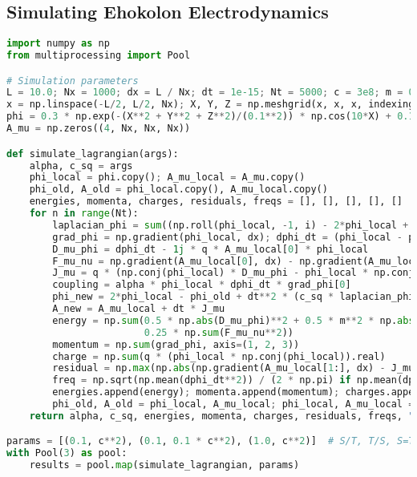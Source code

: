 \documentclass{article}
\begin{document}
\subsection{Simulating Ehokolon Electrodynamics}
\begin{lstlisting}[language=Python, caption=Simulating Ehokolon Electrodynamics, label=lst:ehokolo]
import numpy as np
from multiprocessing import Pool

# Simulation parameters
L = 10.0; Nx = 1000; dx = L / Nx; dt = 1e-15; Nt = 5000; c = 3e8; m = 0.5; g = 2.0; q = 1.0
x = np.linspace(-L/2, L/2, Nx); X, Y, Z = np.meshgrid(x, x, x, indexing='ij')
phi = 0.3 * np.exp(-(X**2 + Y**2 + Z**2)/(0.1**2)) * np.cos(10*X) + 0.1 * np.random.rand(Nx, Nx, Nx)
A_mu = np.zeros((4, Nx, Nx, Nx))

def simulate_lagrangian(args):
    alpha, c_sq = args
    phi_local = phi.copy(); A_mu_local = A_mu.copy()
    phi_old, A_old = phi_local.copy(), A_mu_local.copy()
    energies, momenta, charges, residuals, freqs = [], [], [], [], []
    for n in range(Nt):
        laplacian_phi = sum((np.roll(phi_local, -1, i) - 2*phi_local + np.roll(phi_local, 1, i)) / dx**2 for i in range(3))
        grad_phi = np.gradient(phi_local, dx); dphi_dt = (phi_local - phi_old) / dt
        D_mu_phi = dphi_dt - 1j * q * A_mu_local[0] * phi_local
        F_mu_nu = np.gradient(A_mu_local[0], dx) - np.gradient(A_mu_local[1:], dt)
        J_mu = q * (np.conj(phi_local) * D_mu_phi - phi_local * np.conj(D_mu_phi))
        coupling = alpha * phi_local * dphi_dt * grad_phi[0]
        phi_new = 2*phi_local - phi_old + dt**2 * (c_sq * laplacian_phi - m**2 * phi_local - g * phi_local**3 + coupling)
        A_new = A_mu_local + dt * J_mu
        energy = np.sum(0.5 * np.abs(D_mu_phi)**2 + 0.5 * m**2 * np.abs(phi_local)**2 + 0.25 * g * np.abs(phi_local)**4 + 
                        0.25 * np.sum(F_mu_nu**2))
        momentum = np.sum(grad_phi, axis=(1, 2, 3))
        charge = np.sum(q * (phi_local * np.conj(phi_local)).real)
        residual = np.max(np.abs(np.gradient(A_mu_local[1:], dx) - J_mu - np.gradient(A_mu_local[0], dt)))
        freq = np.sqrt(np.mean(dphi_dt**2)) / (2 * np.pi) if np.mean(dphi_dt**2) > 0 else 0
        energies.append(energy); momenta.append(momentum); charges.append(charge); residuals.append(residual); freqs.append(freq)
        phi_old, A_old = phi_local, A_mu_local; phi_local, A_mu_local = phi_new, A_new
    return alpha, c_sq, energies, momenta, charges, residuals, freqs, "Stable"

params = [(0.1, c**2), (0.1, 0.1 * c**2), (1.0, c**2)]  # S/T, T/S, S=T
with Pool(3) as pool:
    results = pool.map(simulate_lagrangian, params)
\end{lstlisting}
\end{document}
